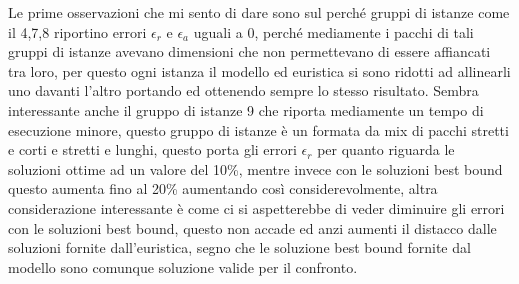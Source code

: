 Le prime osservazioni che mi sento di dare sono sul perché gruppi di istanze come il 4,7,8 riportino errori $\epsilon_r$ e $\epsilon_a$ uguali a 0, perché mediamente i pacchi di tali gruppi di istanze avevano dimensioni che non permettevano di essere affiancati tra loro, per questo ogni istanza il modello ed euristica si sono ridotti ad allinearli uno davanti l'altro portando ed ottenendo sempre lo stesso risultato. Sembra interessante anche il gruppo di istanze 9 che riporta mediamente un tempo di esecuzione minore, questo gruppo di istanze è un formata da mix di pacchi stretti e corti e stretti e lunghi, questo porta gli errori $\epsilon_r$ per quanto riguarda le soluzioni ottime ad un valore del 10\%, mentre invece con le soluzioni best bound questo aumenta fino al 20\% aumentando così considerevolmente, altra considerazione interessante è come ci si aspetterebbe di veder diminuire gli errori con le soluzioni best bound, questo non accade ed anzi aumenti il distacco dalle soluzioni fornite dall'euristica, segno che le soluzione best bound fornite dal modello sono comunque soluzione valide per il confronto.

\newpage
